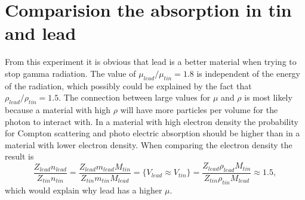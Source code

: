 \documentclass[12pt]{report}
\begin{document}
\section{Comparision the absorption in tin and lead}
From this experiment it is obvious that lead is a better material when trying to stop gamma radiation. The value of $\mu_{lead}/\mu_{tin} = 1.8$ is independent of the energy of the radiation, which possibly could be explained by the fact that $\rho_{lead}/\rho_{tin} = 1.5$. The connection between large values for $\mu$ and $\rho$ is most likely because a material with high $\rho$ will have more particles per volume for the photon to interact with. In a material with high electron density the probability for Compton scattering and photo electric absorption should be higher than in a material with lower electron density. When comparing the electron density the result is
\begin{equation}
    \frac{Z_{lead}n_{lead}}{Z_{tin}n_{tin}} = \frac{Z_{lead}m_{lead}M_{tin}}{Z_{tin}m_{tin}M_{lead}} = \{V_{lead} \approx V_{tin}\} = \frac{Z_{lead}\rho_{lead}M_{tin}}{Z_{tin}\rho_{tin}M_{lead}} \approx 1.5,
\end{equation}
which would explain why lead has a higher $\mu$.

\printbibliography
\end{document}
